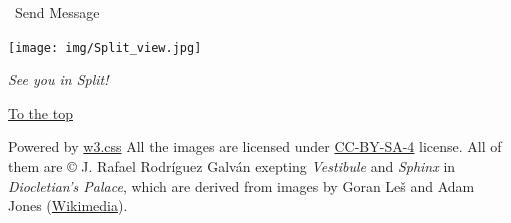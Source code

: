 \documentclass[
]{article}
\begin{document}
\hfill\break

\emph{}~Send Message

\texttt{[image: img/Split\_view.jpg]}

\emph{See you in Split!}

\protect\hyperlink{home}{\emph{}To the top}

\emph{} \emph{} \emph{} \emph{}

Powered by \href{https://www.w3schools.com/w3css/default.asp}{w3.css}
All the images are licensed under
\href{https://commons.wikimedia.org/wiki/Category:CC-BY-SA-4.0}{CC-BY-SA-4}
license. All of them are © J. Rafael Rodríguez Galván exepting
\emph{Vestibule} and \emph{Sphinx} in \emph{Diocletian's Palace}, which
are derived from images by Goran Leš and Adam Jones
(\href{https://commons.wikimedia.org}{Wikimedia}).
\end{document}
